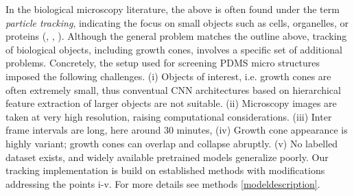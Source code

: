 In the biological microscopy literature, the above is often found under the term
\textit{particle tracking}, indicating the focus on small objects such as cells,
organelles, or proteins (\cite{celltracking}, \cite{organelltracking},
\cite{proteintracking}). Although the general problem matches the outline above,
tracking of biological objects, including growth cones, involves a specific set
of additional problems. Concretely, the setup used for screening PDMS micro
structures imposed the following challenges. (i) Objects of interest, i.e.
growth cones are often extremely small, thus conventual CNN architectures based
on hierarchical feature extraction of larger objects are not suitable. (ii)
Microscopy images are taken at very high resolution, raising computational
considerations. (iii) Inter frame intervals are long, here around 30 minutes,
(iv) Growth cone appearance is highly variant; growth cones can overlap and
collapse abruptly. (v) No labelled dataset exists, and widely available
pretrained models generalize poorly. Our tracking implementation is build on
established methods with modifications addressing the points i-v. For more
details see methods \ref{modeldescription}. \\






